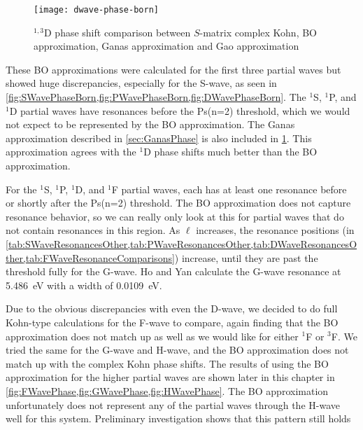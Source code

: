 \documentclass[Dissertation.tex]{subfiles}
\begin{document}
\begin{figure}
	\centering
	\texttt{[image: dwave-phase-born]}
	\caption[$^{1,3}$D complex Kohn and BO comparison]{$^{1,3}$D phase shift comparison between $S$-matrix complex Kohn, BO approximation, Ganas approximation and Gao approximation}
	\label{fig:DWavePhaseBorn}
\end{figure}


These BO approximations were calculated for the first three partial waves 
but showed huge discrepancies, especially for the S-wave, as seen in
\cref{fig:SWavePhaseBorn,fig:PWavePhaseBorn,fig:DWavePhaseBorn}. The 
$^1$S, $^1$P, and $^1$D partial waves have resonances before the Ps(n=2)
threshold, which we would not expect to be represented by the BO approximation.
The Ganas approximation described in \cref{sec:GanasPhase} is also included in
\cref{fig:DWavePhaseBorn}. This approximation agrees with the $^1$D phase
shifts much better than the BO approximation.

For the $^1$S, $^1$P, $^1$D, and $^1$F partial waves, each has at least one 
resonance before or shortly after the Ps(n=2) threshold. The BO 
approximation does not capture resonance behavior, so we can really only look 
at this for partial waves that do not contain resonances in this region. As
$\ell$ increases, the resonance positions
(in \cref{tab:SWaveResonancesOther,tab:PWaveResonancesOther,tab:DWaveResonancesOther,tab:FWaveResonanceComparisons})
increase, until they are past the threshold fully for the G-wave.
Ho and Yan \cite{Ho2000} calculate the G-wave resonance
at \SI{5.486}{eV} with a width of \SI{0.0109}{eV}.

Due to the obvious discrepancies with even the D-wave, we decided to do 
full Kohn-type calculations for the F-wave to compare, again finding that the BO 
approximation does not match up as well as we would like for either
$^1$F or $^3$F. We tried the same for the G-wave and H-wave, and the BO approximation
does not match up with the complex Kohn phase shifts.
The results of using the BO approximation for the higher partial waves are 
shown later in this chapter in
\cref{fig:FWavePhase,fig:GWavePhase,fig:HWavePhase}. The BO approximation 
unfortunately does not represent any of the partial waves through the H-wave 
well for this system. Preliminary investigation shows that this pattern still holds
\end{document}
